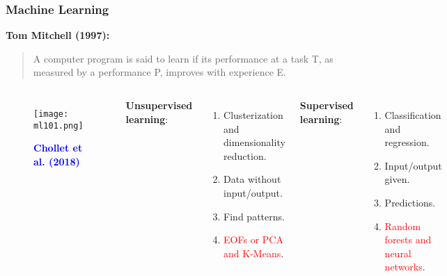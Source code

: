 \documentclass[11pt]{beamer}
\newcommand{\citat}[2]{\textbf{\textcolor{blue}{#1 et al. (#2)}}}
\begin{document}
\begin{frame}
  \frametitle{\normalsize{\textbf{
        Machine Learning
  }}} 

  \scriptsize{
    
    \textbullet \: \textbf{Tom Mitchell (1997):}

    \begin{quote}
      A computer program is said to learn if its performance at a task T, as
      measured by a performance P, improves with experience E.
    \end{quote}

    \begin{columns}
      
      \begin{figure}[h!]
        \centering
        \texttt{[image: ml101.png]}
        \caption*{\tiny{
            \citat{Chollet}{2018}
        }}
      \end{figure}
      
      
      \textbf{Unsupervised learning}:
      \begin{enumerate}
      \item Clusterization and dimensionality reduction.
      \item Data without input/output.
      \item Find patterns.
      \item \textcolor{red}{EOFs or PCA and K-Means}.
      \end{enumerate}

      \textbf{Supervised learning}:
      \begin{enumerate}
      \item Classification and regression.
      \item Input/output given.
      \item Predictions.
      \item \textcolor{red}{Random forests and neural networks}.
      \end{enumerate}
      
    \end{columns}
      
  }
  
\end{frame}
\end{document}
